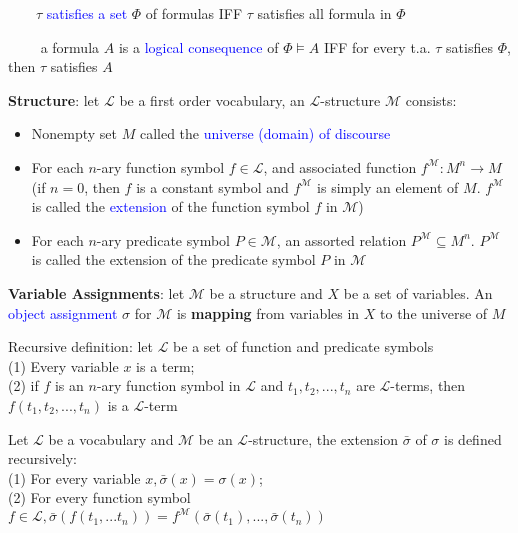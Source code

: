 \documentclass[7pt,landscape]{article}
\begin{document}
\begin{multicols}{2}
$\quad \quad \tau$ \textcolor{blue}{satisfies a set} $\Phi$ of formulas IFF $\tau$ satisfies all formula in $\Phi$

$\quad\quad$ a formula $A$ is a \textcolor{blue}{logical consequence} of $\Phi \vDash A$ IFF for every t.a. $\tau$ satisfies $\Phi$, then $\tau$ satisfies $A$

\textbf{Structure}: let $\mathcal{L}$ be a first order vocabulary, an $\mathcal{L}$-structure $\mathcal{M}$ consists:

\begin{itemize}
    \item Nonempty set $M$ called the \textcolor{blue}{universe (domain) of discourse}
    \item For each $n$-ary function symbol $f \in \mathcal{L}$, and associated function $f^{\mathcal{M}}: M^{n} \rightarrow M$ (if $n=0$, then $f$ is a constant symbol and $f^{\mathcal{M}}$ is simply an element of $M$. $f^{\mathcal{M}}$ is called the \textcolor{blue}{extension} of the function symbol $f$ in $\mathcal{M}$)
    \item For each $n$-ary predicate symbol $P \in \mathcal{M}$, an assorted relation $P^{\mathcal{M}} \subseteq M^{n}$. $P^{\mathcal{M}}$ is called the extension of the predicate symbol $P$ in $\mathcal{M}$
\end{itemize}

\newpage

\textbf{Variable Assignments}: let $\mathcal{M}$ be a structure and $X$ be a set of variables. An \textcolor{blue}{object assignment} $\sigma$ for $\mathcal{M}$ is \textbf{mapping} from variables in $X$ to the universe of $M$

Recursive definition: let $\mathcal{L}$ be a set of function and predicate symbols \\
(1) Every variable $x$ is a term; \\
(2) if $f$ is an $n$-ary function symbol in $\mathcal{L}$ and $t_1, t_2, ..., t_n$ are $\mathcal{L}$-terms, then $f(t_1, t_2, ..., t_n)$ is a $\mathcal{L}$-term

Let $\mathcal{L}$ be a vocabulary and $\mathcal{M}$ be an $\mathcal{L}$-structure, the extension $\bar{\sigma}$ of $\sigma$ is defined recursively: \\
(1) For every variable $x, \bar{\sigma}(x) = \sigma (x)$;\\
(2) For every function symbol $f \in \mathcal{L}, \bar{\sigma}(f(t_1, ...t_n)) = f^{\mathcal{M}} (\bar{\sigma} (t_1), ..., \bar{\sigma} (t_n))$


\end{multicols}
\end{document}
